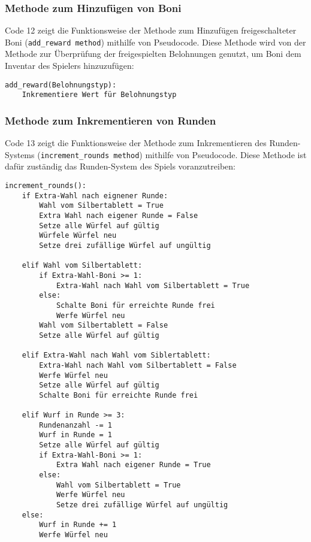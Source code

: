 \subsubsection{Methode zum Hinzufügen von Boni}
\begin{minipage}{\linewidth}
Code 12 zeigt die Funktionsweise der Methode zum Hinzufügen freigeschalteter Boni (\texttt{add\_reward method}) mithilfe von Pseudocode. Diese Methode wird von der Methode zur Überprüfung der freigespielten Belohnungen genutzt, um Boni dem Inventar des Spielers hinzuzufügen:
\vspace{0.5cm}
\begin{lstlisting}[caption={Methode zum Hinzufügen freigschalteter Boni}]
add_reward(Belohnungstyp):
	Inkrementiere Wert für Belohnungstyp
\end{lstlisting}
\end{minipage}

\subsubsection{Methode zum Inkrementieren von Runden}
Code 13 zeigt die Funktionsweise der Methode zum Inkrementieren des Runden-Systems (\texttt{increment\_rounds method}) mithilfe von Pseudocode. Diese Methode ist dafür zuständig das Runden-System des Spiels voranzutreiben:
\vspace{0.5cm}
\begin{lstlisting}[caption={Methode zum Inkrementieren des Runden-Systems}]
increment_rounds():
	if Extra-Wahl nach eignener Runde:
		Wahl vom Silbertablett = True
		Extra Wahl nach eigener Runde = False
		Setze alle Würfel auf gültig
		Würfele Würfel neu
		Setze drei zufällige Würfel auf ungültig
		
	elif Wahl vom Silbertablett:
		if Extra-Wahl-Boni >= 1:
			Extra-Wahl nach Wahl vom Silbertablett = True
		else:
			Schalte Boni für erreichte Runde frei
			Werfe Würfel neu
		Wahl vom Silbertablett = False
		Setze alle Würfel auf gültig
	
	elif Extra-Wahl nach Wahl vom Siblertablett:
		Extra-Wahl nach Wahl vom Silbertablett = False
		Werfe Würfel neu
		Setze alle Würfel auf gültig
		Schalte Boni für erreichte Runde frei
	
	elif Wurf in Runde >= 3:
		Rundenanzahl -= 1
		Wurf in Runde = 1
		Setze alle Würfel auf gültig
		if Extra-Wahl-Boni >= 1:
			Extra Wahl nach eigener Runde = True
		else:
			Wahl vom Silbertablett = True
			Werfe Würfel neu
			Setze drei zufällige Würfel auf ungültig
	else:
		Wurf in Runde += 1
		Werfe Würfel neu
\end{lstlisting}
